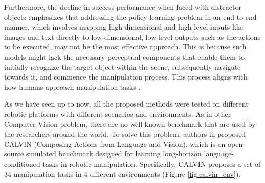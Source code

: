 Furthermore, the decline in success performance when faced with distractor objects emphasizes that addressing the policy-learning problem in an end-to-end manner, which involves mapping high-dimensional and high-level inputs like images and text directly to low-dimensional, low-level outputs such as the actions to be executed, may not be the most effective approach. This is because such models might lack the necessary perceptual components that enable them to initially recognize the target object within the scene, subsequently navigate towards it, and commence the manipulation process. This process aligns with how humans approach manipulation tasks \cite{grill2003neural}.


As we have seen up to now, all the proposed methods were tested on different robotic platforms with different scenarios and environments. As in other Computer Vision problem, there are no well known benchmark that are used by the researchers around the world. To solve this problem, authors in \cite{mees2022calvin} proposed CALVIN (Composing Actions from Language and Vision), which is an open-source simulated benchmark designed for learning long-horizon language-conditioned tasks in robotic manipulation. Specifically, CALVIN proposes a set of 34 manipulation tasks in 4 different environments (Figure \ref{fig:calvin_env}). 


